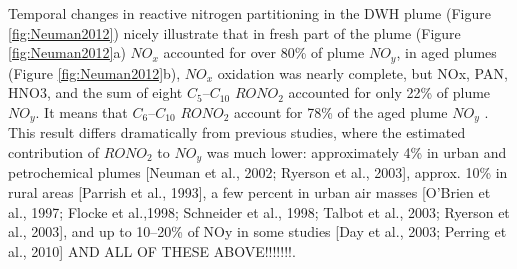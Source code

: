 \documentclass[11pt,a4paper]{article}
\begin{document}
Temporal changes in reactive nitrogen partitioning in the DWH plume (Figure \ref{fig:Neuman2012}) nicely illustrate that in fresh part of the plume (Figure \ref{fig:Neuman2012}a) $NO_x$ accounted for over 80\% of plume $NO_y$, in aged plumes (Figure \ref{fig:Neuman2012}b), $NO_x$ oxidation was nearly complete, but NOx, PAN, HNO3, and the sum of eight $C_5$–$C_{10}$ $RONO_2$ accounted for only 22\% of plume $NO_y$. It means that $C_6$–$C_{10}$ $RONO_2$ account for 78\% of the aged plume $NO_y$ \citep{Neuman2012}. This result differs dramatically from previous studies, where the estimated contribution of $RONO_2$ to $NO_y$ was much lower: approximately 4\% in urban and petrochemical plumes [Neuman et al., 2002; Ryerson et al., 2003], approx. 10\% in rural areas [Parrish et al., 1993], a few percent in urban air masses [O’Brien et al., 1997; Flocke et al.,1998; Schneider et al., 1998; Talbot et al., 2003; Ryerson et al., 2003], and up to 10–20\% of NOy in some studies [Day et al., 2003; Perring et al., 2010] AND ALL OF THESE ABOVE!!!!!!!.
\end{document}
